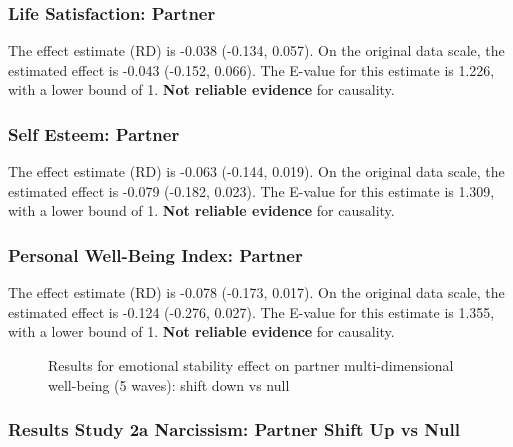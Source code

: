 \documentclass[
  singlecolumn]{article}
\begin{document}
\subsubsection{Life Satisfaction:
Partner}\label{life-satisfaction-partner-14}

The effect estimate (RD) is -0.038 (-0.134, 0.057). On the original data
scale, the estimated effect is -0.043 (-0.152, 0.066). The E-value for
this estimate is 1.226, with a lower bound of 1. \textbf{Not reliable
evidence} for causality.

\subsubsection{Self Esteem: Partner}\label{self-esteem-partner-14}

The effect estimate (RD) is -0.063 (-0.144, 0.019). On the original data
scale, the estimated effect is -0.079 (-0.182, 0.023). The E-value for
this estimate is 1.309, with a lower bound of 1. \textbf{Not reliable
evidence} for causality.

\subsubsection{Personal Well-Being Index:
Partner}\label{personal-well-being-index-partner-14}

The effect estimate (RD) is -0.078 (-0.173, 0.017). On the original data
scale, the estimated effect is -0.124 (-0.276, 0.027). The E-value for
this estimate is 1.355, with a lower bound of 1. \textbf{Not reliable
evidence} for causality.

\begin{figure}


\caption{\label{fig-results-emotional-stability-partner-down-long}Results
for emotional stability effect on partner multi-dimensional well-being
(5 waves): shift down vs null}

\end{figure}%

\newpage{}

\subsubsection{Results Study 2a Narcissism: Partner Shift Up vs
Null}\label{results-study-2a-narcissism-partner-shift-up-vs-null}
\end{document}
